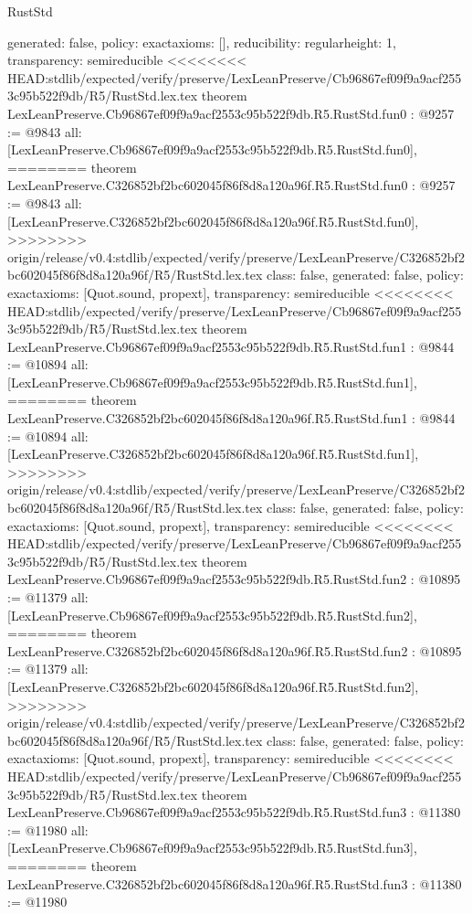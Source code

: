 \begin{lexlean}{RustStd}
\begin{coremodule}
{\begin{coremodule}
{{{  generated: false,
  policy: exact{axioms: []},
  reducibility: regular{height: 1},
  transparency: semireducible
}
<<<<<<<< HEAD:stdlib/expected/verify/preserve/LexLeanPreserve/Cb96867ef09f9a9acf2553c95b522f9db/R5/RustStd.lex.tex
theorem LexLeanPreserve.Cb96867ef09f9a9acf2553c95b522f9db.R5.RustStd.fun0 : @9257 := @9843 {
  all: [LexLeanPreserve.Cb96867ef09f9a9acf2553c95b522f9db.R5.RustStd.fun0],
========
theorem LexLeanPreserve.C326852bf2bc602045f86f8d8a120a96f.R5.RustStd.fun0 : @9257 := @9843 {
  all: [LexLeanPreserve.C326852bf2bc602045f86f8d8a120a96f.R5.RustStd.fun0],
>>>>>>>> origin/release/v0.4:stdlib/expected/verify/preserve/LexLeanPreserve/C326852bf2bc602045f86f8d8a120a96f/R5/RustStd.lex.tex
  class: false,
  generated: false,
  policy: exact{axioms: [Quot.sound, propext]},
  transparency: semireducible
}
<<<<<<<< HEAD:stdlib/expected/verify/preserve/LexLeanPreserve/Cb96867ef09f9a9acf2553c95b522f9db/R5/RustStd.lex.tex
theorem LexLeanPreserve.Cb96867ef09f9a9acf2553c95b522f9db.R5.RustStd.fun1 : @9844 := @10894 {
  all: [LexLeanPreserve.Cb96867ef09f9a9acf2553c95b522f9db.R5.RustStd.fun1],
========
theorem LexLeanPreserve.C326852bf2bc602045f86f8d8a120a96f.R5.RustStd.fun1 : @9844 := @10894 {
  all: [LexLeanPreserve.C326852bf2bc602045f86f8d8a120a96f.R5.RustStd.fun1],
>>>>>>>> origin/release/v0.4:stdlib/expected/verify/preserve/LexLeanPreserve/C326852bf2bc602045f86f8d8a120a96f/R5/RustStd.lex.tex
  class: false,
  generated: false,
  policy: exact{axioms: [Quot.sound, propext]},
  transparency: semireducible
}
<<<<<<<< HEAD:stdlib/expected/verify/preserve/LexLeanPreserve/Cb96867ef09f9a9acf2553c95b522f9db/R5/RustStd.lex.tex
theorem LexLeanPreserve.Cb96867ef09f9a9acf2553c95b522f9db.R5.RustStd.fun2 : @10895 := @11379 {
  all: [LexLeanPreserve.Cb96867ef09f9a9acf2553c95b522f9db.R5.RustStd.fun2],
========
theorem LexLeanPreserve.C326852bf2bc602045f86f8d8a120a96f.R5.RustStd.fun2 : @10895 := @11379 {
  all: [LexLeanPreserve.C326852bf2bc602045f86f8d8a120a96f.R5.RustStd.fun2],
>>>>>>>> origin/release/v0.4:stdlib/expected/verify/preserve/LexLeanPreserve/C326852bf2bc602045f86f8d8a120a96f/R5/RustStd.lex.tex
  class: false,
  generated: false,
  policy: exact{axioms: [Quot.sound, propext]},
  transparency: semireducible
}
<<<<<<<< HEAD:stdlib/expected/verify/preserve/LexLeanPreserve/Cb96867ef09f9a9acf2553c95b522f9db/R5/RustStd.lex.tex
theorem LexLeanPreserve.Cb96867ef09f9a9acf2553c95b522f9db.R5.RustStd.fun3 : @11380 := @11980 {
  all: [LexLeanPreserve.Cb96867ef09f9a9acf2553c95b522f9db.R5.RustStd.fun3],
========
theorem LexLeanPreserve.C326852bf2bc602045f86f8d8a120a96f.R5.RustStd.fun3 : @11380 := @11980 {
}}}}}}}
\end{coremodule}}
\end{coremodule}
\end{lexlean}
